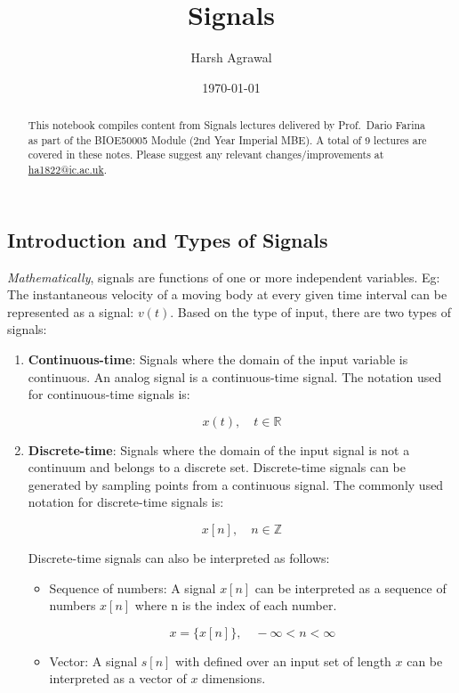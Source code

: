 \documentclass[letterpaper,12pt]{article}
\begin{document}
\title{Signals}
\author{Harsh Agrawal}
\date{\today}
\maketitle

\begin{abstract}
    This notebook compiles content from Signals lectures delivered by Prof.\ Dario Farina as part of the BIOE50005 Module (2nd Year Imperial MBE). A total of 9 lectures are covered in these notes. Please suggest any relevant changes/improvements at \href{ha1822@ic.ac.uk}{ha1822@ic.ac.uk}.
\end{abstract}


\subsection*{Introduction and Types of Signals}

\textit{Mathematically}, signals are functions of one or more independent variables. Eg: The instantaneous velocity of a moving body at every given time interval can be represented as a signal: \(v(t)\). Based on the type of input, there are two types of signals:
\begin{enumerate}
    \item \textbf{Continuous-time}: Signals where the domain of the input variable is continuous. An analog signal is a continuous-time signal. The notation used for continuous-time signals is:

          \[x(t), \quad t \in \mathbb{R}\]

    \item \textbf{Discrete-time}: Signals where the domain of the input signal is not a continuum and belongs to a discrete set. Discrete-time signals can be generated by sampling points from a continuous signal. The commonly used notation for discrete-time signals is:

          \[x[n], \quad n \in \mathbb{Z}\]

          Discrete-time signals can also be interpreted as follows:
          \begin{itemize}
              \item Sequence of numbers: A signal $x[n]$ can be interpreted as a sequence of numbers $x[n]$ where n is the index of each number.

                    \[x = \{x[n]\}, \quad -\infty < n < \infty\]

              \item Vector: A signal $s[n]$ with defined over an input set of length $x$ can be interpreted as a vector of $x$ dimensions.

          \end{itemize}

\end{enumerate}
\end{document}
